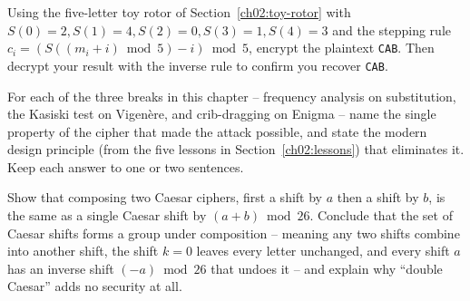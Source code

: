 \begin{exercise}
\label{ch02:ex-rotor}
Using the five-letter toy rotor of Section~\ref{ch02:toy-rotor} with
$S(0)=2,S(1)=4,S(2)=0,S(3)=1,S(4)=3$ and the stepping rule $c_i = (S((m_i+i)\bmod 5)-i)\bmod 5$,
encrypt the plaintext \texttt{CAB}. Then decrypt your result with the inverse rule to confirm
you recover \texttt{CAB}.
\end{exercise}

\begin{exercise}
\label{ch02:ex-design}
For each of the three breaks in this chapter -- frequency analysis on substitution, the Kasiski
test on Vigen\`ere, and crib-dragging on Enigma -- name the single property of the cipher that
made the attack possible, and state the modern design principle (from the five lessons in
Section~\ref{ch02:lessons}) that eliminates it. Keep each answer to one or two sentences.
\end{exercise}

\begin{exercise}
\label{ch02:ex-prove}
Show that composing two Caesar ciphers, first a shift by $a$ then a shift by $b$, is the same as
a single Caesar shift by $(a+b)\bmod 26$. Conclude that the set of Caesar shifts forms a group
under composition -- meaning any two shifts combine into another shift, the shift $k=0$ leaves
every letter unchanged, and every shift $a$ has an inverse shift $(-a)\bmod 26$ that undoes it --
and explain why ``double Caesar'' adds no security at all.
\end{exercise}
